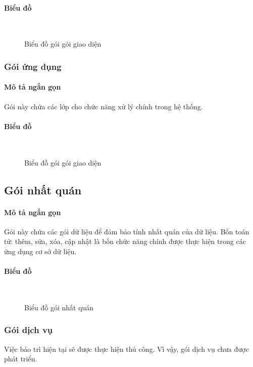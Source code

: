 \documentclass[./../main_file.tex]{subfiles}
\begin{document}
	\paragraph{Biểu đồ} ~\\
	\begin{figure}[H]
		\centering
		\resizebox{0.7\textwidth}{!}{}
		\caption{Biểu đồ gói gói giao diện}
	\end{figure}
	\subsubsection{Gói ứng dụng}
	\paragraph{Mô tả ngắn gọn}
	Gói này chứa các lớp cho chức năng xử lý chính trong hệ thống.
	\paragraph{Biểu đồ}~\\
	\begin{figure}[H]
		\centering
		\resizebox{.9\textwidth}{!}{}
		\caption{Biểu đồ gói gói giao diện}
	\end{figure}
	\subsection{Gói nhất quán}
	\paragraph{Mô tả ngắn gọn}
	Gói này chứa các gói dữ liệu để đảm bảo tính nhất quán của dữ liệu. Bốn toán tử: thêm, sửa, xóa, cập nhật là bốn chức năng chính được thực hiện trong các ứng dụng cơ sở dữ liệu.
	\paragraph{Biểu đồ}~\\
		\begin{figure}[H]
		\centering
		\resizebox{0.7\textwidth}{!}{}
		\caption{Biểu đồ gói nhất quán}
	\end{figure}
	\subsubsection{Gói dịch vụ}
	Việc bảo trì hiện tại sẽ được thực hiện thủ công. Vì vậy, gói dịch vụ chưa được phát triển.
	
\end{document}
